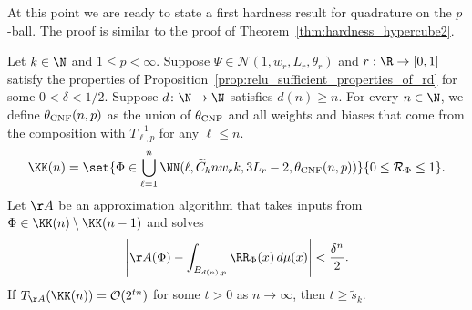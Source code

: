 \documentclass{amsart}[11pt]
\numberwithin{equation}{section}
\newcommand{\nn}{\mathcal{N}}
\newcommand{\realization}{\mathcal{R}}
\newcommand{\order}{\mathcal{O}}
\newcommand{\worstTime}{T}
\numberwithin{theorem}{section}
\begin{document}
At this point we are ready to state a first hardness result for quadrature on the $p$-ball. The proof is similar to the proof of Theorem~\ref{thm:hardness_hypercube2}.

\begin{theorem}\label{thm:hardness_ball_low_precision}
    Let $k\in \N$ and $1 \leq p < \infty$. Suppose $\Psi \in \nn(1, w_r, L_r, \theta_r)$ and $r: \R \to [0, 1]$ satisfy the properties of Proposition~\ref{prop:relu_sufficient_properties_of_rd} for some $0 < \delta < 1/2$. Suppose $d\colon \N\to\N$ satisfies $d(n)\geq n$. For every $n \in \N$, we define $\theta_{\rm{CNF}}(n, p)$ as the union of $\theta_{\rm{CNF}}$ and all weights and biases that come from the composition with $T^{-1}_{\ell, p}$ for any $\ell\leq n$.
    \begin{align}
        \KK(n) =  \set{\Phi \in \bigcup_{\ell = 1}^n \NN(\ell ,\widetilde C_k n w_r k, 3L_r-2, \theta_{\rm{CNF}}(n, p)) }{0\leq\realization_\Phi\leq 1}.
    \end{align}
    Let $\AA$ be an approximation algorithm that takes inputs from $\Phi \in \KK(n)\setminus\KK(n - 1)$ and solves
    \begin{align*}
        \left|\AA(\Phi) - \int_{B_{d(n), p}} \RR_\Phi(x) \, d\mu(x)\right| < \frac{\delta^{n}}{2}.
    \end{align*}
    If $\worstTime_{\AA}(\KK(n)) = \order(2^{tn})$ for some $t>0$ as $n \to \infty$, then $t \geq \widetilde s_k$.
\end{theorem}
\end{document}
